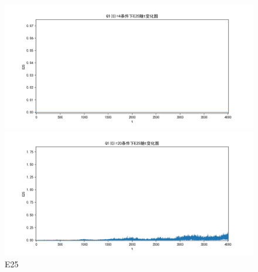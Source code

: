 \documentclass[10pt, a4paper]{article}
\begin{document}
    \begin{figure}[H]
        \begin{minipage}[t]{0.49\textwidth}
            \centering
            \includegraphics[width=\textwidth]{./q5_pics/cmp/E25.png}
        \end{minipage}
        \begin{minipage}[t]{0.49\textwidth}
            \centering
            \includegraphics[width=\textwidth]{./q5_pics/exp/E25.png}
        \end{minipage}
        \caption{E25}\label{fig:E25 in q5}
    \end{figure}
\end{document}
